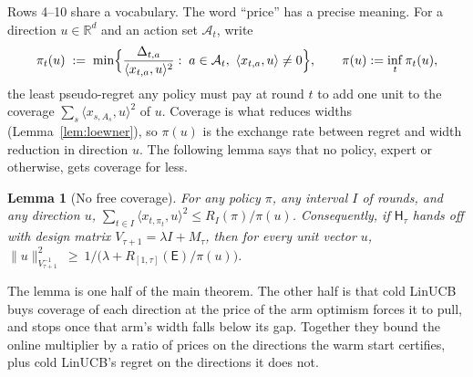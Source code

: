 \documentclass{article}
\newtheorem{lemma}{Lemma}
\theoremstyle{definition}
\theoremstyle{remark}
\newcommand{\R}{\mathbb{R}}
\theoremstyle{remark}
\newcommand{\Exp}{\mathsf{E}}
\newcommand{\Hyb}{\mathsf{H}}
\begin{document}
Rows 4--10 share a vocabulary. The word ``price'' has a precise meaning. For a direction $u\in\R^d$ and an
action set $\mathcal A_t$, write
\begin{equation}
\label{eq:price}
\pi_t(u)\;:=\;\min\Bigl\{\frac{\Delta_{t,a}}{\langle x_{t,a},u\rangle^2}:\;a\in\mathcal A_t,\ \langle x_{t,a},u\rangle\neq0\Bigr\},
\qquad \pi(u):=\inf_t\pi_t(u),
\end{equation}
the least pseudo-regret any policy must pay at round $t$ to add one unit to
the coverage $\sum_s\langle x_{s,A_s},u\rangle^2$ of $u$. Coverage is what
reduces widths (Lemma~\ref{lem:loewner}), so $\pi(u)$ is the exchange rate
between regret and width reduction in direction $u$. The following lemma
says that no policy, expert or otherwise, gets coverage for less.

\begin{lemma}[No free coverage]
\label{lem:no-free-coverage}
For any policy $\pi$, any interval $I$ of rounds, and any direction $u$,
$\sum_{t\in I}\langle x_{t,\pi_t},u\rangle^2\le R_I(\pi)/\pi(u)$.
Consequently, if $\Hyb_\tau$ hands off with design matrix $V_{\tau+1}=\lambda I+M_\tau$, then
for every unit vector $u$,
$\|u\|^2_{V_{\tau+1}^{-1}}\ \ge\ 1\big/\bigl(\lambda+R_{[1,\tau]}(\Exp)/\pi(u)\bigr)$.
\end{lemma}

The lemma is one half of the main theorem. The other half is that cold
LinUCB buys coverage of each direction at the price of the arm optimism
forces it to pull, and stops once that arm's width falls below its gap.
Together they bound the online multiplier by a ratio of prices on the
directions the warm start certifies, plus cold LinUCB's regret on the
directions it does not.
\end{document}
